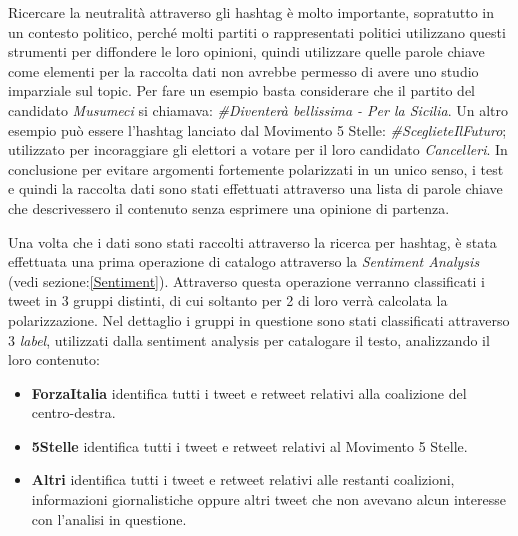 Ricercare la neutralità attraverso gli hashtag è molto importante, sopratutto in un contesto politico, perché molti partiti o rappresentati politici utilizzano questi strumenti per diffondere le loro opinioni, quindi utilizzare quelle parole chiave come elementi per la raccolta dati non avrebbe permesso di avere uno studio imparziale sul topic.
Per fare un esempio basta considerare che il partito del candidato \textit{Musumeci} si chiamava: \textit{\#Diventerà bellissima - Per la Sicilia}.
Un altro esempio può essere l'hashtag lanciato dal Movimento 5 Stelle: \textit{\#SceglieteIlFuturo}; utilizzato per incoraggiare gli elettori a votare per il loro candidato \textit{Cancelleri}.
In conclusione per evitare argomenti fortemente polarizzati in un unico senso, i test e quindi la raccolta dati sono stati effettuati attraverso una lista di parole chiave che descrivessero il contenuto senza esprimere una opinione di partenza.

Una volta che i dati sono stati raccolti attraverso la ricerca per hashtag, è stata effettuata una prima operazione di catalogo attraverso la \textit{Sentiment Analysis} (vedi sezione:\ref{Sentiment}). Attraverso questa operazione verranno classificati i tweet in 3 gruppi distinti, di cui soltanto per 2 di loro verrà calcolata la polarizzazione.
Nel dettaglio i gruppi in questione sono stati classificati attraverso 3 \textit{label}, utilizzati dalla sentiment analysis per catalogare il testo, analizzando il loro contenuto:
\begin{itemize}
\item \textbf{ForzaItalia} identifica tutti i tweet e retweet relativi alla coalizione del centro-destra.
\item \textbf{5Stelle} identifica tutti i tweet e retweet relativi al Movimento 5 Stelle.
\item \textbf{Altri} identifica tutti i tweet e retweet relativi alle restanti coalizioni, informazioni giornalistiche oppure altri tweet che non avevano alcun interesse con l'analisi in questione.
\end{itemize}

